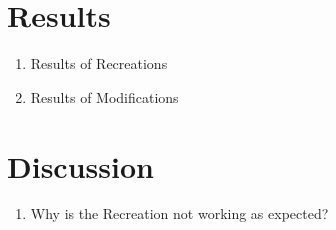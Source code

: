 \section{Results}
\begin{enumerate}
    \item Results of Recreations
    \item Results of Modifications
\end{enumerate}

\section{Discussion}
\begin{enumerate}
    \item Why is the Recreation not working as expected?
\end{enumerate}



\newpage
\nocite{Adelson1996}
\nocite{Brainard2003-BRACCD-2}
\nocite{Hanson1978}
\nocite{Murray2021}
\nocite{Kingdom2014}
\nocite{Robinson2007}
\vspace*{1cm}
\begin{minipage}{1\textwidth}
\printbibliography
\end{minipage}



